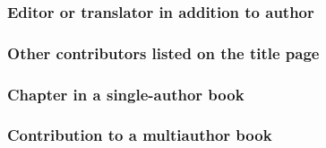 \documentclass[11pt,letterpaper,oneside]{article}
\begin{document}
\subsubsection{Editor or translator in addition to author}
\label{14.104}

\begin{citebib}
\item \cite{bonnefoy1995}
\item \cite{menchu1999}
\item \cite{adorno1999}
\end{citebib}

\subsubsection{Other contributors listed on the title page}
\label{14.105}

\begin{citebib}
\item \cite{chaucer1966}
\item \cite{cullen1961}
\item \cite{hayek1994}
\item \cite{prather1998}
\item \cite{williams1990}
\end{citebib}

\subsubsection{Chapter in a single-author book}

\begin{citebib}
\item \cite[211]{brower2015.8}
\item \cite{samples2006.7}
\item \cite[30-31]{samples2006.7}
\end{citebib}

\subsubsection{Contribution to a multiauthor book}

\begin{citebib}
\item \cite[325]{miller2014}
\item \cite{ellet1968}
\end{citebib}
\end{document}

